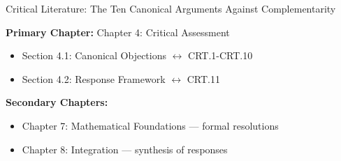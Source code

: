 \begin{chapter}{Critical Literature: The Ten Canonical Arguments Against Complementarity}
\begin{tcolorbox}[colback=purple!5!white, colframe=purple!75!black,
    title=Chapter Linkage]

\textbf{Primary Chapter:} Chapter 4: Critical Assessment
\begin{itemize}[nosep]
\item Section 4.1: Canonical Objections $\leftrightarrow$ CRT.1-CRT.10
\item Section 4.2: Response Framework $\leftrightarrow$ CRT.11
\end{itemize}

\textbf{Secondary Chapters:}
\begin{itemize}[nosep]
\item Chapter 7: Mathematical Foundations --- formal resolutions
\item Chapter 8: Integration --- synthesis of responses
\end{itemize}

\end{tcolorbox}

\begin{abstract}
This appendix systematically documents the critical literature on complementarity, distilling \textbf{ten canonical arguments} that recur across disciplines. These objections---concerning identification, model-dependence, scale, context, dominance, complexity, measurement noise, post-hoc narrativity, normativity, and conceptual vagueness---are not chaotic but \textit{structured}. This structure reveals that the critiques are \textbf{methodological, not ontological}: they explain why complementarity remained under-formalized, but do not refute its existence. The appendix presents 100 references (50 supporting, 50 contrasting) and demonstrates how the EBF $\gamma$-framework addresses each canonical objection. The central conclusion: \textit{the objections against complementarity are precisely what a formal theory must---and can---resolve.}
\end{abstract}



\end{chapter}
